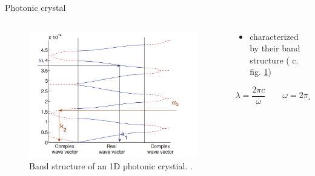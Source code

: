 \begin{frame}{Photonic crystal}

  \begin{columns}

    \begin{column}{0.49\textwidth}
      \begin{figure}
        \centering
        \includegraphics[width=1\textwidth]{./bilder/band_structure.png}
        \caption{Band structure of an 1D photonic crystial. \cite{intro_pho}.}
        \label{fig: band_structure}
      \end{figure}
    \end{column}

    \begin{column}{0.49\textwidth}
    \begin{itemize}
      \setlength\itemsep{1.2em}
      \item{characterized by their band structure ( c. fig. \ref{fig: band_structure}) }
    \end{itemize}
    \begin{equation*}
      \lambda=\frac{2\pi c}{\omega}\qquad \omega =2\pi f
    \end{equation*}
    \end{column}

  \end{columns}

\end{frame}

